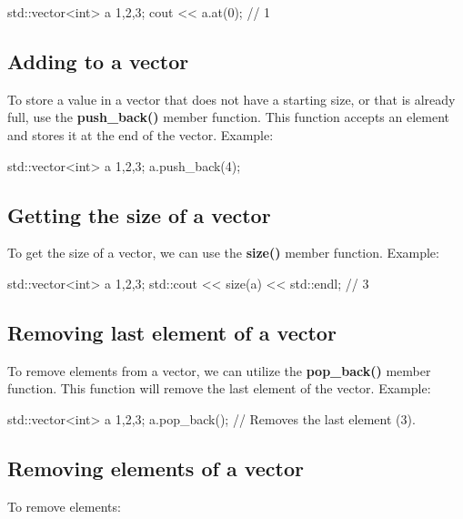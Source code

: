 \documentclass{report}
\begin{document}
    \begin{cppcode}
std::vector<int> a {1,2,3};
cout << a.at(0); // 1
    \end{cppcode}
    

    \bigbreak \noindent 
    \subsection{Adding to a vector}
    \bigbreak \noindent 
    To store a value in a vector that does not have a starting size, or that is already full, use the \textbf{push\_back()} member function. This function accepts an element and stores it at the end of the vector.
    \bigbreak \noindent 
    Example:
    \bigbreak \noindent 
    
    \begin{cppcode}
std::vector<int> a {1,2,3};
a.push_back(4);
    \end{cppcode}
    

    \bigbreak \noindent 
    \subsection{Getting the size of a vector}
    \bigbreak \noindent 
    To get the size of a vector, we can use the \textbf{size()} member function.
    \bigbreak \noindent 
    Example:
    \bigbreak \noindent 
    
    \begin{cppcode}
std::vector<int> a {1,2,3};
std::cout << size(a) << std::endl;  // 3
    \end{cppcode}
    

    \bigbreak \noindent 
    \subsection{Removing last element of a vector} 
    \bigbreak \noindent 
    To remove elements from a vector, we can utilize the \textbf{pop\_back()} member function. This function will remove the last element of the vector.
    \bigbreak \noindent 
    Example:
    \bigbreak \noindent 
    
    \begin{cppcode}
std::vector<int> a {1,2,3};
a.pop_back(); // Removes the last element (3).
    \end{cppcode}
    

    \bigbreak \noindent 
    \subsection{Removing elements of a vector }
    \bigbreak \noindent 
    To remove elements:
    \bigbreak \noindent 
    
\end{document}

